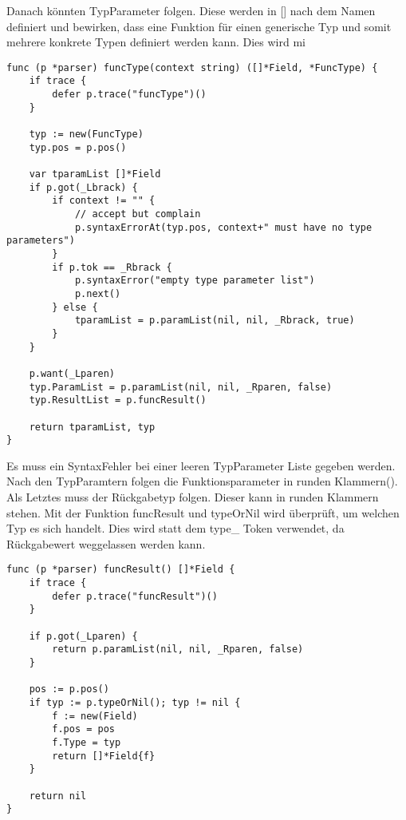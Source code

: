 Danach könnten TypParameter folgen. Diese werden in [] nach dem Namen definiert und bewirken, dass eine Funktion für einen generische Typ und somit mehrere konkrete Typen definiert werden kann. Dies wird mi

\begin{lstlisting}
func (p *parser) funcType(context string) ([]*Field, *FuncType) {
	if trace {
		defer p.trace("funcType")()
	}

	typ := new(FuncType)
	typ.pos = p.pos()

	var tparamList []*Field
	if p.got(_Lbrack) {
		if context != "" {
			// accept but complain
			p.syntaxErrorAt(typ.pos, context+" must have no type parameters")
		}
		if p.tok == _Rbrack {
			p.syntaxError("empty type parameter list")
			p.next()
		} else {
			tparamList = p.paramList(nil, nil, _Rbrack, true)
		}
	}

	p.want(_Lparen)
	typ.ParamList = p.paramList(nil, nil, _Rparen, false)
	typ.ResultList = p.funcResult()

	return tparamList, typ
}
\end{lstlisting}
Es muss ein SyntaxFehler bei einer leeren TypParameter Liste gegeben werden. Nach den TypParamtern folgen die Funktionsparameter in runden Klammern().  Als Letztes muss der Rückgabetyp folgen. Dieser kann in runden Klammern stehen. Mit der Funktion funcResult und typeOrNil wird überprüft, um welchen Typ es sich handelt. Dies wird statt dem type\_ Token verwendet, da Rückgabewert weggelassen werden kann. 

\begin{lstlisting}
func (p *parser) funcResult() []*Field {
	if trace {
		defer p.trace("funcResult")()
	}

	if p.got(_Lparen) {
		return p.paramList(nil, nil, _Rparen, false)
	}

	pos := p.pos()
	if typ := p.typeOrNil(); typ != nil {
		f := new(Field)
		f.pos = pos
		f.Type = typ
		return []*Field{f}
	}

	return nil
}

\end{lstlisting}
